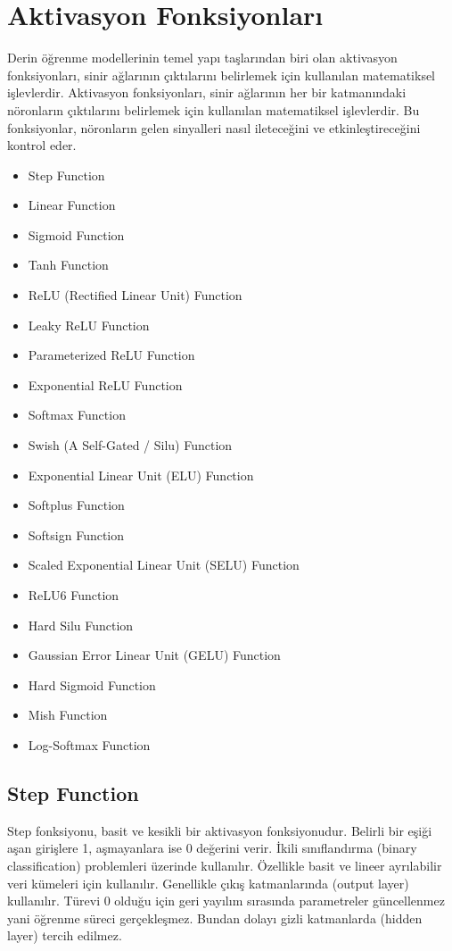 \section{Aktivasyon Fonksiyonları}
Derin öğrenme modellerinin temel yapı taşlarından biri olan aktivasyon fonksiyonları, sinir ağlarının çıktılarını belirlemek için kullanılan matematiksel işlevlerdir. Aktivasyon fonksiyonları, sinir ağlarının her bir katmanındaki nöronların çıktılarını belirlemek için kullanılan matematiksel işlevlerdir. Bu fonksiyonlar, nöronların gelen sinyalleri nasıl ileteceğini ve etkinleştireceğini kontrol eder.

\begin{itemize}
    \item Step Function
    \item Linear Function
    \item Sigmoid Function
    \item Tanh Function
    \item ReLU (Rectified Linear Unit) Function
    \item Leaky ReLU Function
    \item Parameterized ReLU Function
    \item Exponential ReLU Function
    \item Softmax Function
    \item Swish (A Self-Gated / Silu) Function
    \item Exponential Linear Unit (ELU) Function
    \item Softplus Function
    \item Softsign Function
    \item Scaled Exponential Linear Unit (SELU) Function
    \item ReLU6 Function
    \item Hard Silu Function
    \item Gaussian Error Linear Unit (GELU) Function
    \item Hard Sigmoid Function
    \item Mish Function
    \item Log-Softmax Function
\end{itemize}

\newpage

\subsection{Step Function}
Step fonksiyonu, basit ve kesikli bir aktivasyon fonksiyonudur. Belirli bir eşiği aşan girişlere 1, aşmayanlara ise 0 değerini verir. İkili sınıflandırma (binary classification) problemleri üzerinde kullanılır. Özellikle basit ve lineer ayrılabilir veri kümeleri için kullanılır. Genellikle çıkış katmanlarında (output layer) kullanılır. Türevi 0 olduğu için geri yayılım sırasında parametreler güncellenmez yani öğrenme süreci gerçekleşmez. Bundan dolayı gizli katmanlarda (hidden layer) tercih edilmez.

